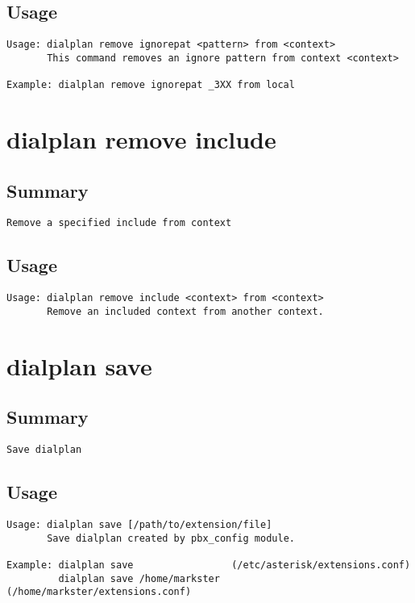 \subsection{Usage}
\begin{verbatim}
Usage: dialplan remove ignorepat <pattern> from <context>
       This command removes an ignore pattern from context <context>

Example: dialplan remove ignorepat _3XX from local

\end{verbatim}


\section{dialplan remove include}
\subsection{Summary}
\begin{verbatim}
Remove a specified include from context
\end{verbatim}
\subsection{Usage}
\begin{verbatim}
Usage: dialplan remove include <context> from <context>
       Remove an included context from another context.

\end{verbatim}


\section{dialplan save}
\subsection{Summary}
\begin{verbatim}
Save dialplan
\end{verbatim}
\subsection{Usage}
\begin{verbatim}
Usage: dialplan save [/path/to/extension/file]
       Save dialplan created by pbx_config module.

Example: dialplan save                 (/etc/asterisk/extensions.conf)
         dialplan save /home/markster  (/home/markster/extensions.conf)

\end{verbatim}


